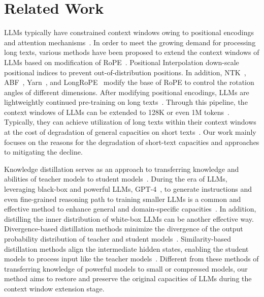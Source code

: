 \section{Related Work}
\label{sec:related_work}
LLMs typically have constrained context windows owing to positional encodings and attention mechanisms~\cite{press-iclr-2022-alibi,han-arxiv-2023-lm}. In order to meet the growing demand for processing long texts, various methods have been proposed to extend the context windows of LLMs based on modification of RoPE~\cite{su-neurocomputing-2024-roformer}. Positional Interpolation down-scale positional indices to prevent out-of-distribution positions. In addition, NTK~\cite{bloc97-reddit-2023-ntk,emozilla-reddit-2023-dynamicntk}, ABF~\cite{xiong-naacl-2024-effective}, Yarn~\cite{peng-arxiv-2023-yarn}, and LongRoPE~\cite{ding-icml-2024-longrope} modify the base of RoPE to control the rotation angles of different dimensions. After modifying positional encodings, LLMs are lightweightly continued pre-training on long texts~\cite{fu-icml-2024-data}. Through this pipeline, the context windows of LLMs can be extended to 128K or even 1M tokens~\cite{Dubey-arxiv-2023-llama3,Zeng-arxiv-2024-glm}. Typically, they can achieve utilization of long texts within their context windows at the cost of degradation of general capacities on short texts~\cite{Dubey-arxiv-2023-llama3}. Our work mainly focuses on the reasons for the degradation of short-text capacities and approaches to mitigating the decline. 


 Knowledge distillation serves as an approach to transferring knowledge and abilities of teacher models to student models~\cite{Hinton-arxiv-2015-Distilling,Xu-arxiv-2024-Survey}. During the era of LLMs, leveraging black-box and powerful LLMs, \eg GPT-4~\cite{openai-arxiv-2023-gpt4}, to generate instructions and even fine-grained reasoning path to training smaller LLMs is a common and effective method to enhance general and domain-specific capacities~\cite{vicuna2023,peng-arxiv-2023-instruction,mukherjee-arxiv-2023-orca,ho-acl-2023-large}. In addition, distilling the inner distribution of white-box LLMs can be another effective way. Divergence-based distillation methods minimize the divergence of the output probability distribution of teacher and student models~\cite{Gu-ICLR-2024-Minillm,agarwal-iclr-2024-on,jiang-arxiv-2024-MixCPT}. Similarity-based distillation methods align the intermediate hidden states, enabling the student models to process input like the teacher models~\cite{liang-icml-2023-less, Muralidharan-arxiv-2024-Compact}. Different from these methods of transferring knowledge of powerful models to small or compressed models, our method aims to restore and preserve the original capacities of LLMs during the context window extension stage. 
